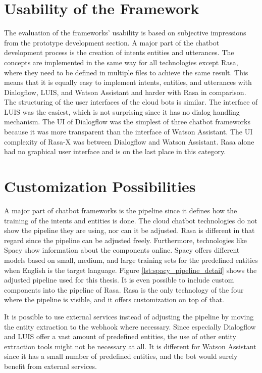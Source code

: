 \section*{Usability of the Framework}
The evaluation of the frameworks' usability is based on subjective impressions from the prototype development section.
A major part of the chatbot development process is the creation of intents entities and utterances.
The concepts are implemented in the same way for all technologies except Rasa, where they need to be defined in multiple files to achieve the same result.
This means that it is equally easy to implement intents, entities, and utterances with Dialogflow, LUIS, and Watson Assistant and harder with Rasa in comparison.
The structuring of the user interfaces of the cloud bots is similar.
The interface of LUIS was the easiest, which is not surprising since it has no dialog handling mechanism.
The UI of Dialogflow was the simplest of three chatbot frameworks because it was more transparent than the interface of Watson Assistant.
The UI complexity of Rasa-X was between Dialogflow and Watson Assistant.
Rasa alone had no graphical user interface and is on the last place in this 
category. 

\section*{Customization Possibilities}
A major part of chatbot frameworks is the pipeline since it defines how the training of the intents and entities is done.
The cloud chatbot technologies do not show the pipeline they are using, nor can it be adjusted.
Rasa is different in that regard since the pipeline can be adjusted freely.
Furthermore, technologies like Spacy show information about the components online.
Spacy offers different models based on small, medium, and large training sets for the predefined entities when English is the target language.
Figure \ref{lst:spacy_pipeline_detail} shows the adjusted pipeline used for this thesis.
It is even possible to include custom components into the pipeline of Rasa.
Rasa is the only technology of the four where the pipeline is visible, and it offers customization on top of that.

It is possible to use external services instead of adjusting the pipeline by 
moving the entity extraction to the webhook where necessary.
Since especially Dialogflow and LUIS offer a vast amount of predefined entities, the use of other entity extraction tools might not be necessary at all.
It is different for Watson Assistant since it has a small number of predefined entities, and the bot would surely benefit from external services.

